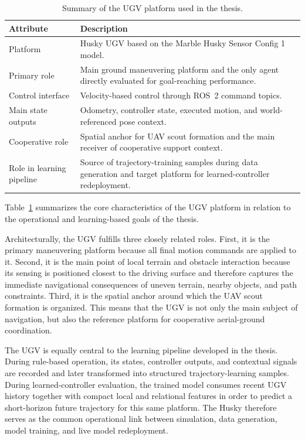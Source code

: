 \begin{table}[tbp]
    \caption{Summary of the UGV platform used in the thesis.}
    \label{tab:ugv_platform_summary}
    \centering
    \begin{tabularx}{\textwidth}{@{}>{\raggedright\arraybackslash}p{}X@{}}
        \toprule
        \textbf{Attribute} & \textbf{Description} \\
        \midrule
        Platform & Husky UGV based on the Marble Husky Sensor Config 1 model. \\
        Primary role & Main ground maneuvering platform and the only agent directly evaluated for goal-reaching performance. \\
        Control interface & Velocity-based control through ROS~2 command topics. \\
        Main state outputs & Odometry, controller state, executed motion, and world-referenced pose context. \\
        Cooperative role & Spatial anchor for UAV scout formation and the main receiver of cooperative support context. \\
        Role in learning pipeline & Source of trajectory-training samples during data generation and target platform for learned-controller redeployment. \\
        \bottomrule
    \end{tabularx}
\end{table}

Table~\ref{tab:ugv_platform_summary} summarizes the core characteristics of the UGV platform in relation to the operational and learning-based goals of the thesis.

Architecturally, the UGV fulfills three closely related roles. First, it is the primary maneuvering platform because all final motion commands are applied to it. Second, it is the main point of local terrain and obstacle interaction because its sensing is positioned closest to the driving surface and therefore captures the immediate navigational consequences of uneven terrain, nearby objects, and path constraints. Third, it is the spatial anchor around which the UAV scout formation is organized. This means that the UGV is not only the main subject of navigation, but also the reference platform for cooperative aerial-ground coordination.

The UGV is equally central to the learning pipeline developed in the thesis. During rule-based operation, its states, controller outputs, and contextual signals are recorded and later transformed into structured trajectory-learning samples. During learned-controller evaluation, the trained model consumes recent UGV history together with compact local and relational features in order to predict a short-horizon future trajectory for this same platform. The Husky therefore serves as the common operational link between simulation, data generation, model training, and live model redeployment.

